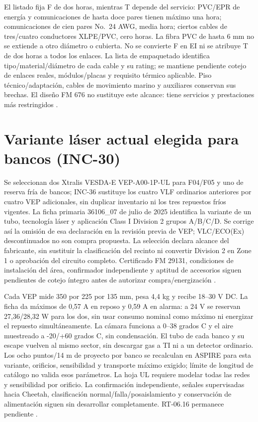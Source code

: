 El listado fija F de dos horas, mientras T depende del servicio: PVC/EPR de energía y comunicaciones de hasta doce pares tienen máximo una hora; comunicaciones de cien pares No.~24 AWG, media hora; ciertos cables de tres/cuatro conductores XLPE/PVC, cero horas. La fibra PVC de hasta 6 mm no se extiende a otro diámetro o cubierta. No se convierte F en EI ni se atribuye T de dos horas a todos los enlaces. La lista de empaquetado identifica tipo/material/diámetro de cada cable y su rating; se mantiene pendiente cotejo de enlaces reales, módulos/placas y requisito térmico aplicable. Piso técnico/adaptación, cables de movimiento marino y auxiliares conservan sus brechas. El diseño FM 676 no sustituye este alcance: tiene servicios y prestaciones más restringidos \parencite[pp.~3--4]{lote30-caj8309}\parencite{lote30-fm676}.

\section{Variante láser actual elegida para bancos (INC-30)}
\label{sec:sd4-inc30}
Se seleccionan dos Xtralis VESDA-E VEP-A00-1P-UL para F04/F05 y uno de reserva fría de bancos; INC-36 sustituye los cuatro VLF ordinarios anteriores por cuatro VEP adicionales, sin duplicar inventario ni los tres repuestos fríos vigentes. La ficha primaria 36106\_07 de julio de 2025 identifica la variante de un tubo, tecnología láser y aplicación Class I Division 2 grupos A/B/C/D. Se corrige así la omisión de esa declaración en la revisión previa de VEP; VLC/ECO(Ex) descontinuados no son compra propuesta. La selección declara alcance del fabricante, sin sustituir la clasificación del recinto ni convertir Division 2 en Zone 1 o aprobación del circuito completo. Certificado FM 29131, condiciones de instalación del área, confirmador independiente y aptitud de accesorios siguen pendientes de cotejo íntegro antes de autorizar compra/energización \parencite[pp.~1--2]{lote30-vep36106}.

Cada VEP mide 350 por 225 por 135 mm, pesa 4,4 kg y recibe 18--30 V DC. La ficha da máximos de 0,57 A en reposo y 0,59 A en alarma: a 24 V se reservan 27,36/28,32 W para los dos, sin usar consumo nominal como máximo ni energizar el repuesto simultáneamente. La cámara funciona a 0--38 grados C y el aire muestreado a -20/+60 grados C, sin condensación. El tubo de cada banco y su escape vuelven al mismo sector, sin descargar gas a TI ni a un detector ordinario. Los ocho puntos/14 m de proyecto por banco se recalculan en ASPIRE para esta variante, orificios, sensibilidad y transporte máximo exigido; límite de longitud de catálogo no valida esos parámetros. La hoja UL requiere modelar todas las redes y sensibilidad por orificio. La confirmación independiente, señales supervisadas hacia Cheetah, clasificación normal/falla/posaislamiento y conservación de alimentación siguen sin desarrollar completamente. RT-06.16 permanece pendiente \parencite[pp.~2--3]{lote30-vep36106}\parencite{lote30-vepinst}.

